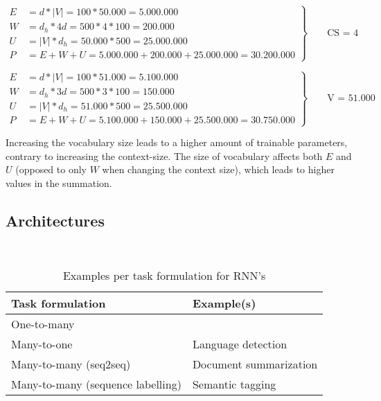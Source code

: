 \documentclass[a4paper, 11pt]{article}
\begin{document}
\begin{equation}
	\left.\begin{aligned}
		E &= d*|V| = 100 * 50.000 = 5.000.000\\
		W &= d_h * 4d = 500 * 4 * 100 = 200.000\\
		U &= |V| * d_h = 50.000 * 500 = 25.000.000\\
		P &= E + W + U = 5.000.000 + 200.000 + 25.000.000 = 30.200.000
	\end{aligned}
	\right\}
	\qquad \text{CS = 4}
\end{equation}

\begin{equation}
	\left.\begin{aligned}
		E &= d*|V| = 100 * 51.000 = 5.100.000\\
		W &= d_h * 3d = 500 * 3 * 100 = 150.000\\
		U &= |V| * d_h = 51.000 * 500 = 25.500.000\\
		P &= E + W + U = 5.100.000 + 150.000 + 25.500.000 = 30.750.000
	\end{aligned}
	\right\}
	\qquad \text{V = 51.000}
\end{equation}

Increasing the vocabulary size leads to a higher amount of trainable parameters, contrary to increasing the context-size. The size of vocabulary affects both $E$ and $U$ (opposed to only $W$ when changing the context size), which leads to higher values in the summation.
\subsection{Architectures}

\noindent{}\\

\begin{table}[h]
	\centering
	\begin{tabular}{l|l}
	\textbf{Task formulation}	& \textbf{Example(s)} \\ \hline
	One-to-many	&  \\
	Many-to-one	& Language detection \\
	Many-to-many (seq2seq)	& Document summarization \\
	Many-to-many (sequence labelling) & Semantic tagging
	\end{tabular}
	\caption{Examples per task formulation for RNN's}
	\label{tab:examples_rnn}
\end{table}
\end{document}

